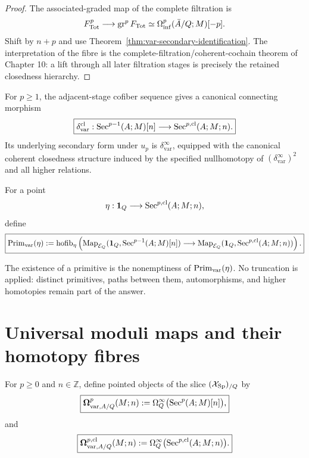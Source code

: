\begin{proof}
The associated-graded map of the complete filtration is
\[
    F_{\mathrm{Tot}}^p
    \longrightarrow
    \operatorname{gr}^pF_{\mathrm{Tot}}
    \simeq
    \Omega_{\mathrm{inf}}^p(\bar A/Q;M)[-p].
\]
Shift by \(n+p\) and use Theorem~\ref{thm:var-secondary-identification}. The interpretation of the fibre is the complete-filtration/coherent-cochain theorem of Chapter 10: a lift through all later filtration stages is precisely the retained closedness hierarchy.
\end{proof}

\begin{construction}
\label{con:var-exact-classifier}
For \(p\ge1\), the adjacent-stage cofiber sequence gives a canonical connecting morphism
\[
    \boxed{
    \delta^{\mathrm{cl}}_{\mathrm{var}}:
    \operatorname{Sec}^{p-1}(A;M)[n]
    \longrightarrow
    \operatorname{Sec}^{p,\mathrm{cl}}(A;M;n).
    }
\]
Its underlying secondary form under \(u_p\) is \(\delta^{\infty}_{\mathrm{var}}\), equipped with the canonical coherent closedness structure induced by the specified nullhomotopy of \((\delta^{\infty}_{\mathrm{var}})^2\) and all higher relations.
\end{construction}

\begin{definition}
\label{def:var-primitive}
For a point
\[
    \eta:\mathbf 1_Q\longrightarrow\operatorname{Sec}^{p,\mathrm{cl}}(A;M;n),
\]
define
\[
    \boxed{
    \operatorname{Prim}_{\mathrm{var}}(\eta)
    :=
    \operatorname{hofib}_{\eta}\left(
      \operatorname{Map}_{\mathcal E_Q}(\mathbf 1_Q,\operatorname{Sec}^{p-1}(A;M)[n])
      \longrightarrow
      \operatorname{Map}_{\mathcal E_Q}(\mathbf 1_Q,\operatorname{Sec}^{p,\mathrm{cl}}(A;M;n))
    \right).
    }
\]
\end{definition}

\begin{remark}
\label{rem:var-exactness-space}
The existence of a primitive is the nonemptiness of \(\operatorname{Prim}_{\mathrm{var}}(\eta)\). No truncation is applied: distinct primitives, paths between them, automorphisms, and higher homotopies remain part of the answer.
\end{remark}

\section{Universal moduli maps and their homotopy fibres}
\label{sec:var-moduli}

\begin{definition}
\label{def:var-moduli}
For \(p\ge0\) and \(n\in\mathbb Z\), define pointed objects of the slice \((\mathcal{X}_{\mathrm{Sp}})_{/Q}\) by
\[
    \boxed{
    \boldsymbol\Omega^p_{\mathrm{var},A/Q}(M;n)
    :=
    \Omega_Q^\infty\bigl(\operatorname{Sec}^p(A;M)[n]\bigr),
    }
\]
and
\[
    \boxed{
    \boldsymbol\Omega^{p,\mathrm{cl}}_{\mathrm{var},A/Q}(M;n)
    :=
    \Omega_Q^\infty\bigl(\operatorname{Sec}^{p,\mathrm{cl}}(A;M;n)\bigr).
    }
\]
\end{definition}

